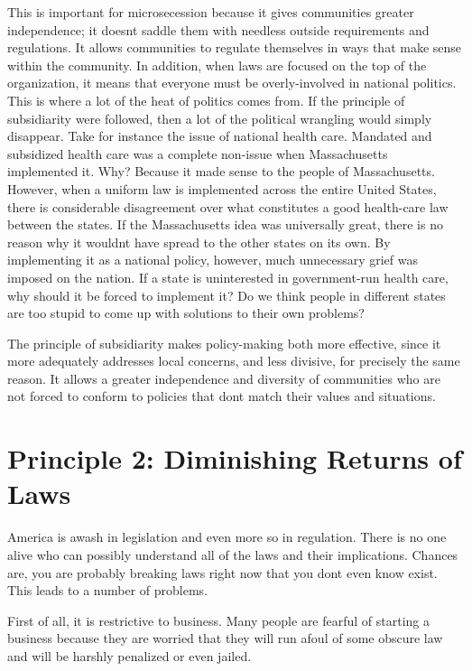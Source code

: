 \documentclass[letterpaper]{article}
\begin{document}
{\color{black}
This is important for microsecession because it gives communities
greater independence; it doesn{\textquotesingle}t saddle them with
needless outside requirements and regulations. It allows communities to
regulate themselves in ways that make sense within the community. In
addition, when laws are focused on the top of the organization, it
means that everyone must be overly-involved in national politics. This
is where a lot of the heat of politics comes from. If the principle of
subsidiarity were followed, then a lot of the political wrangling would
simply disappear. Take for instance the issue of national health care.
Mandated and subsidized health care was a complete non-issue when
Massachusetts implemented it. Why? Because it made sense to the people
of Massachusetts. However, when a uniform law is implemented across the
entire United States, there is considerable disagreement over what
constitutes a good health-care law between the states. If the
Massachusetts idea was universally great, there is no reason why it
wouldn{\textquotesingle}t have spread to the other states on its own.
By implementing it as a national policy, however, much unnecessary
grief was imposed on the nation. If a state is uninterested in
government-run health care, why should it be forced
\textcolor[rgb]{0.32941177,0.5529412,0.83137256}{to implement it}?  Do
we think people in different states are too stupid to come up with
solutions to their own problems?}

{\color{black}
The principle of subsidiarity makes policy-making both more effective,
since it more adequately addresses local concerns, and less divisive,
for precisely the same reason. It allows a greater independence and
diversity of communities who are not forced to conform to policies that
don{\textquotesingle}t match their values and situations.}

\section{Principle 2: Diminishing Returns of Laws}
{\color{black}
America is awash in legislation and even more so in regulation. There is
no one alive who can possibly understand all of the laws and their
implications. Chances are, you are probably breaking laws right now
that you don{\textquotesingle}t even know exist. This leads to a number
of problems. }

{\color{black}
First of all, it is restrictive to business. Many people are fearful of
starting a business because they are worried that they will run afoul
of some obscure law and will be harshly penalized or even jailed. }
\end{document}
